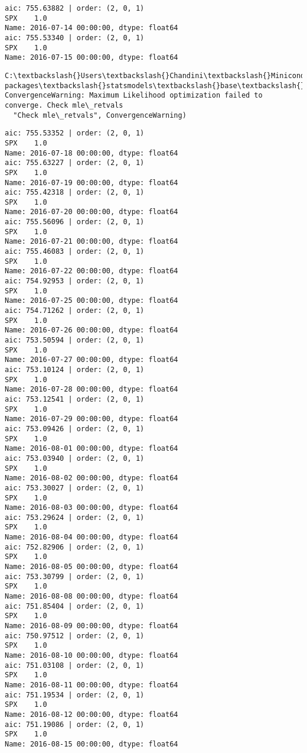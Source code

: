 \documentclass[11pt]{article}
\begin{document}
    \begin{Verbatim}[commandchars=\\\{\}]
aic: 755.63882 | order: (2, 0, 1)
SPX    1.0
Name: 2016-07-14 00:00:00, dtype: float64
aic: 755.53340 | order: (2, 0, 1)
SPX    1.0
Name: 2016-07-15 00:00:00, dtype: float64

    \end{Verbatim}

    \begin{Verbatim}[commandchars=\\\{\}]
C:\textbackslash{}Users\textbackslash{}Chandini\textbackslash{}Miniconda3\textbackslash{}envs\textbackslash{}auquan\textbackslash{}lib\textbackslash{}site-packages\textbackslash{}statsmodels\textbackslash{}base\textbackslash{}model.py:496: ConvergenceWarning: Maximum Likelihood optimization failed to converge. Check mle\_retvals
  "Check mle\_retvals", ConvergenceWarning)

    \end{Verbatim}

    \begin{Verbatim}[commandchars=\\\{\}]
aic: 755.53352 | order: (2, 0, 1)
SPX    1.0
Name: 2016-07-18 00:00:00, dtype: float64
aic: 755.63227 | order: (2, 0, 1)
SPX    1.0
Name: 2016-07-19 00:00:00, dtype: float64
aic: 755.42318 | order: (2, 0, 1)
SPX    1.0
Name: 2016-07-20 00:00:00, dtype: float64
aic: 755.56096 | order: (2, 0, 1)
SPX    1.0
Name: 2016-07-21 00:00:00, dtype: float64
aic: 755.46083 | order: (2, 0, 1)
SPX    1.0
Name: 2016-07-22 00:00:00, dtype: float64
aic: 754.92953 | order: (2, 0, 1)
SPX    1.0
Name: 2016-07-25 00:00:00, dtype: float64
aic: 754.71262 | order: (2, 0, 1)
SPX    1.0
Name: 2016-07-26 00:00:00, dtype: float64
aic: 753.50594 | order: (2, 0, 1)
SPX    1.0
Name: 2016-07-27 00:00:00, dtype: float64
aic: 753.10124 | order: (2, 0, 1)
SPX    1.0
Name: 2016-07-28 00:00:00, dtype: float64
aic: 753.12541 | order: (2, 0, 1)
SPX    1.0
Name: 2016-07-29 00:00:00, dtype: float64
aic: 753.09426 | order: (2, 0, 1)
SPX    1.0
Name: 2016-08-01 00:00:00, dtype: float64
aic: 753.03940 | order: (2, 0, 1)
SPX    1.0
Name: 2016-08-02 00:00:00, dtype: float64
aic: 753.30027 | order: (2, 0, 1)
SPX    1.0
Name: 2016-08-03 00:00:00, dtype: float64
aic: 753.29624 | order: (2, 0, 1)
SPX    1.0
Name: 2016-08-04 00:00:00, dtype: float64
aic: 752.82906 | order: (2, 0, 1)
SPX    1.0
Name: 2016-08-05 00:00:00, dtype: float64
aic: 753.30799 | order: (2, 0, 1)
SPX    1.0
Name: 2016-08-08 00:00:00, dtype: float64
aic: 751.85404 | order: (2, 0, 1)
SPX    1.0
Name: 2016-08-09 00:00:00, dtype: float64
aic: 750.97512 | order: (2, 0, 1)
SPX    1.0
Name: 2016-08-10 00:00:00, dtype: float64
aic: 751.03108 | order: (2, 0, 1)
SPX    1.0
Name: 2016-08-11 00:00:00, dtype: float64
aic: 751.19534 | order: (2, 0, 1)
SPX    1.0
Name: 2016-08-12 00:00:00, dtype: float64
aic: 751.19086 | order: (2, 0, 1)
SPX    1.0
Name: 2016-08-15 00:00:00, dtype: float64

    \end{Verbatim}
\end{document}
